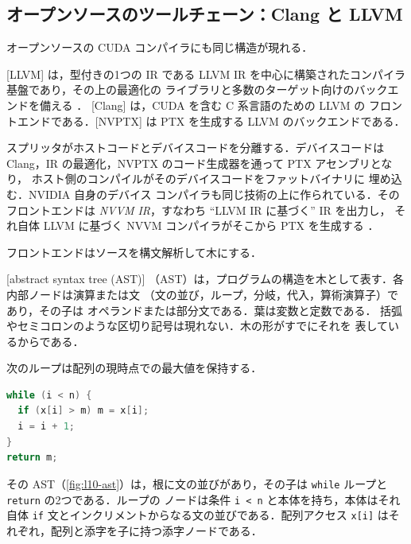 \documentclass[../main.tex]{subfiles}
\begin{document}
\subsection{オープンソースのツールチェーン：Clang と LLVM}

オープンソースの CUDA コンパイラにも同じ構造が現れる．

\begin{definition}
  [LLVM] は，型付きの1つの IR である
  LLVM IR を中心に構築されたコンパイラ基盤であり，その上の最適化の
  ライブラリと多数のターゲット向けのバックエンドを備える
  \cite{lattner2004llvm}．
  [Clang] は，CUDA を含む C 系言語のための LLVM の
  フロントエンドである．[NVPTX] は
  PTX を生成する LLVM のバックエンドである．
\end{definition}

スプリッタがホストコードとデバイスコードを分離する．デバイスコードは
Clang，IR の最適化，NVPTX のコード生成器を通って PTX アセンブリとなり，
ホスト側のコンパイルがそのデバイスコードをファットバイナリに
埋め込む．NVIDIA 自身のデバイス
コンパイラも同じ技術の上に作られている．そのフロントエンドは
\emph{NVVM IR}，すなわち \enquote{LLVM IR に基づく} IR を出力し，
それ自体 LLVM に基づく NVVM コンパイラがそこから PTX を生成する
\cite{nvidia2026nvvm}．

フロントエンドはソースを構文解析して木にする．

\begin{definition}[抽象構文木]
  [abstract syntax tree (AST)]
  （AST）は，プログラムの構造を木として表す．各内部ノードは演算または文
  （文の並び，ループ，分岐，代入，算術演算子）であり，その子は
  オペランドまたは部分文である．葉は変数と定数である．
  括弧やセミコロンのような区切り記号は現れない．木の形がすでにそれを
  表しているからである．
\end{definition}

\begin{example}
  \label{ex:l10-ast}
  次のループは配列の現時点での最大値を保持する．
\begin{lstlisting}[language=C++, numbers=none]
while (i < n) {
  if (x[i] > m) m = x[i];
  i = i + 1;
}
return m;
\end{lstlisting}
  その AST（\cref{fig:l10-ast}）は，根に文の並びがあり，その子は
  \texttt{while} ループと \texttt{return} の2つである．ループの
  ノードは条件 \texttt{i < n} と本体を持ち，本体はそれ自体
  \texttt{if} 文とインクリメントからなる文の並びである．配列アクセス
  \texttt{x[i]} はそれぞれ，配列と添字を子に持つ添字ノードである．
\end{example}
\end{document}
